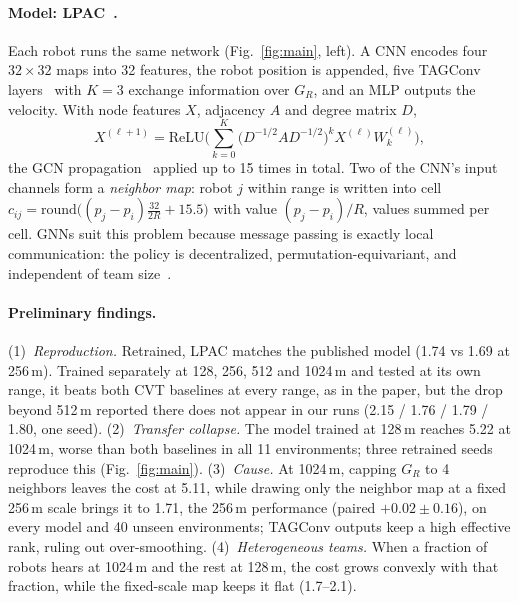 \documentclass{article}
\begin{document}
\paragraph{Model: LPAC~\citep{agarwal2025lpac}.}
Each robot runs the same network (Fig.~\ref{fig:main}, left). A CNN encodes four $32\times32$ maps into 32 features, the robot position is appended, five TAGConv layers~\citep{du2017tagconv} with $K=3$ exchange information over $G_R$, and an MLP outputs the velocity. With node features $X$, adjacency $A$ and degree matrix $D$,
\begin{equation}
X^{(\ell+1)}=\mathrm{ReLU}\Big(\textstyle\sum_{k=0}^{K}\big(D^{-1/2}AD^{-1/2}\big)^{k}X^{(\ell)}W_k^{(\ell)}\Big),
\end{equation}
the GCN propagation~\citep{kipf2017gcn} applied up to 15 times in total. Two of the CNN's input channels form a \emph{neighbor map}: robot $j$ within range is written into cell $c_{ij}=\mathrm{round}\big((p_j-p_i)\tfrac{32}{2R}+15.5\big)$ with value $(p_j-p_i)/R$, values summed per cell. GNNs suit this problem because message passing is exactly local communication: the policy is decentralized, permutation-equivariant, and independent of team size~\citep{tolstaya2019flocking}.

\paragraph{Preliminary findings.}
(1)~\emph{Reproduction.} Retrained, LPAC matches the published model (1.74 vs 1.69 at 256\,m). Trained separately at 128, 256, 512 and 1024\,m and tested at its own range, it beats both CVT baselines at every range, as in the paper, but the drop beyond 512\,m reported there does not appear in our runs (2.15 / 1.76 / 1.79 / 1.80, one seed). (2)~\emph{Transfer collapse.} The model trained at 128\,m reaches 5.22 at 1024\,m, worse than both baselines in all 11 environments; three retrained seeds reproduce this (Fig.~\ref{fig:main}). (3)~\emph{Cause.} At 1024\,m, capping $G_R$ to 4 neighbors leaves the cost at 5.11, while drawing only the neighbor map at a fixed 256\,m scale brings it to 1.71, the 256\,m performance (paired $+0.02\pm0.16$), on every model and 40 unseen environments; TAGConv outputs keep a high effective rank, ruling out over-smoothing. (4)~\emph{Heterogeneous teams.} When a fraction of robots hears at 1024\,m and the rest at 128\,m, the cost grows convexly with that fraction, while the fixed-scale map keeps it flat (1.7--2.1).
\end{document}
